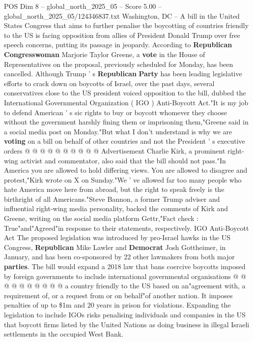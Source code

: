 \begin{textsample}{POS Dim 8 – global\_north\_2025\_05 – Score 5.00 – global\_north\_2025\_05/124346837.txt}  \label{ex:f8_pos_404}
Washington, DC -- A bill in the United States Congress that aims to further penalise the boycotting of countries friendly to the US is facing opposition from allies of President Donald Trump over free speech concerns, putting its passage in jeopardy.
According to \textbf{Republican} \textbf{Congresswoman} Marjorie Taylor Greene, a \textbf{vote} in the House of Representatives on the proposal, previously scheduled for Monday, has been cancelled.
Although Trump ' s \textbf{Republican} \textbf{Party} has been leading legislative efforts to crack down on boycotts of Israel, over the past days, several conservatives close to the US president voiced opposition to the bill, dubbed the International Governmental Organization ( IGO ) Anti-Boycott Act."It is my job to defend American ' s sic rights to buy or boycott whomever they choose without the government harshly fining them or imprisoning them,"Greene said in a social media post on Monday."But what I don't understand is why we are \textbf{voting} on a bill on behalf of other countries and not the President ' s executive orders @ @ @ @ @ @ @ @ @ @ Advertisement Charlie Kirk, a prominent right-wing activist and commentator, also said that the bill should not pass."In America you are allowed to hold differing views.
You are allowed to disagree and protest,"Kirk wrote on X on Sunday."We ' ve allowed far too many people who hate America move here from abroad, but the right to speak freely is the birthright of all Americans."Steve Bannon, a former Trump adviser and influential right-wing media personality, backed the comments of Kirk and Greene, writing on the social media platform Gettr,"Fact check : True"and"Agreed"in response to their statements, respectively.
IGO Anti-Boycott Act The proposed legislation was introduced by pro-Israel hawks in the US Congress, \textbf{Republican} Mike Lawler and \textbf{Democrat} Josh Gottheimer, in January, and has been co-sponsored by 22 other lawmakers from both major \textbf{parties}.
The bill would expand a 2018 law that bans coercive boycotts imposed by foreign governments to include international governmental organisations @ @ @ @ @ @ @ @ @ @ a country friendly to the US based on an"agreement with, a requirement of, or a request from or on behalf"of another nation.
It imposes penalties of up to \$1m and 20 years in prison for violations.
Expanding the legislation to include IGOs risks penalising individuals and companies in the US that boycott firms listed by the United Nations as doing business in illegal Israeli settlements in the occupied West Bank.

\end{textsample}
